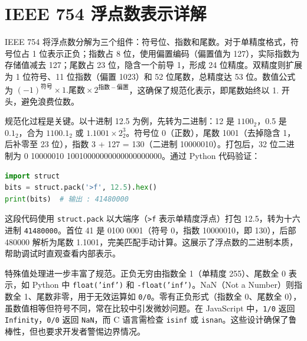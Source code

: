 \chapter{IEEE 754 浮点数表示详解}
IEEE 754 将浮点数分解为三个组件：符号位、指数和尾数。对于单精度格式，符号位占 1 位表示正负；指数占 8 位，使用偏置编码（偏置值为 127），实际指数为存储值减去 127；尾数占 23 位，隐含一个前导 1，形成 24 位精度。双精度则扩展为 1 位符号、11 位指数（偏置 1023）和 52 位尾数，总精度达 53 位。数值公式为 $(-1)^{符号} \times 1.尾数 \times 2^{指数 - 偏置}$，这确保了规范化表示，即尾数始终以 1. 开头，避免浪费位数。\par
规范化过程是关键。以十进制 12.5 为例，先转为二进制：12 是 $1100_2$，0.5 是 $0.1_2$，合为 $1100.1_2$ 或 $1.1001 \times 2^3_2$。符号位 0（正数），尾数 1001（去掉隐含 1，后补零至 23 位），指数 3 + 127 = 130（二进制 10000010）。打包后，32 位二进制为 0 10000010 10010000000000000000000。通过 Python 代码验证：\par
\begin{lstlisting}[language=python]
import struct
bits = struct.pack('>f', 12.5).hex()
print(bits)  # 输出 : 41480000
\end{lstlisting}
这段代码使用 \texttt{struct.pack} 以大端序（\texttt{>f} 表示单精度浮点）打包 12.5，转为十六进制 \texttt{41480000}。首位 41 是 0100 0001（符号 0，指数 10000010，即 130），后部 480000 解析为尾数 1.1001，完美匹配手动计算。这展示了浮点数的二进制本质，帮助调试时直观查看内部表示。\par
特殊值处理进一步丰富了规范。正负无穷由指数全 1（单精度 255）、尾数全 0 表示，如 Python 中 \texttt{float('inf')} 和 \texttt{-float('inf')}。NaN（Not a Number）则指数全 1、尾数非零，用于无效运算如 \texttt{0/0}。零有正负形式（指数全 0、尾数全 0），虽数值相等但符号不同，常在比较中引发微妙问题。在 JavaScript 中，\texttt{1/0} 返回 \texttt{Infinity}，\texttt{0/0} 返回 \texttt{NaN}，而 C 语言需检查 \texttt{isinf} 或 \texttt{isnan}。这些设计确保了鲁棒性，但也要求开发者警惕边界情况。\par
